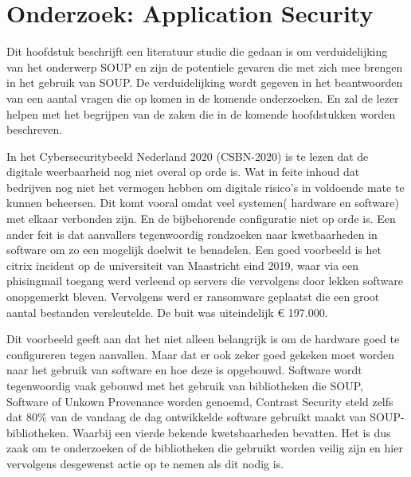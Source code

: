 
\chapter{Onderzoek: Application Security}\label{ch:onderzoek:-application-security}
Dit hoofdstuk beschrijft een literatuur studie die gedaan is om verduidelijking van het onderwerp SOUP en zijn de potentiele gevaren die met zich mee brengen in het gebruik van SOUP. De verduidelijking wordt gegeven in het beantwoorden van een aantal vragen die op komen in de komende onderzoeken.
En zal de lezer helpen met het begrijpen van de zaken die in de komende hoofdstukken worden beschreven.

In het Cybersecuritybeeld Nederland 2020 (CSBN-2020) is te lezen dat de digitale weerbaarheid nog niet overal op orde is.
Wat in feite inhoud dat bedrijven nog niet het vermogen hebben om digitale risico's in voldoende mate te kunnen beheersen.
Dit komt vooral omdat veel systemen( hardware en software) met elkaar verbonden zijn.
En de bijbehorende configuratie niet op orde is.
Een ander feit is dat aanvallers tegenwoordig rondzoeken naar kwetbaarheden in software om zo een mogelijk doelwit te benadelen.
Een goed voorbeeld is het citrix incident op de universiteit van Maastricht eind 2019, waar via een phisingmail toegang werd verleend op servers die vervolgens door lekken software onopgemerkt bleven.
Vervolgens werd er ransomware geplaatst die een groot aantal bestanden versleutelde.
De buit was uiteindelijk € 197.000.

Dit voorbeeld geeft aan dat het niet alleen belangrijk is om de hardware goed te configureren tegen aanvallen.
Maar dat er ook zeker goed gekeken moet worden naar het gebruik van software en hoe deze is opgebouwd.
Software wordt tegenwoordig vaak gebouwd met het gebruik van bibliotheken die SOUP, Software of Unkown Provenance worden genoemd, Contrast Security steld zelfs dat 80\% van de vandaag de dag ontwikkelde software gebruikt maakt van SOUP-bibliotheken.
Waarbij een vierde bekende kwetsbaarheden bevatten.
Het is dus zaak om te onderzoeken of de bibliotheken die gebruikt worden veilig zijn en hier vervolgens desgewenst actie op te nemen als dit nodig is.

